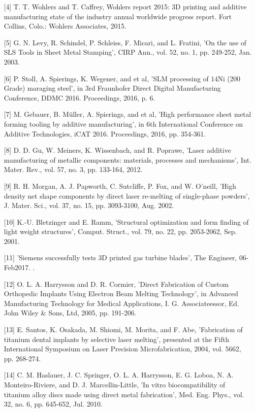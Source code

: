 \documentclass[10pt]{article}
\begin{document}
[4] T. T. Wohlers and T. Caffrey, Wohlers report 2015: 3D printing and additive manufacturing state of the industry annual worldwide progress report. Fort Collins, Colo.: Wohlers Associates, 2015.

[5] G. N. Levy, R. Schindel, P. Schleiss, F. Micari, and L. Fratini, 'On the use of SLS Tools in Sheet Metal Stamping', CIRP Ann., vol. 52, no. 1, pp. 249-252, Jan. 2003.

[6] P. Stoll, A. Spierings, K. Wegener, and et al, 'SLM processing of $14 \mathrm{Ni}$ (200 Grade) maraging steel', in 3rd Fraunhofer Direct Digital Manufacturing Conference, DDMC 2016. Proceedings, 2016, p. 6.

[7] M. Gebauer, B. Müller, A. Spierings, and et al, 'High performance sheet metal forming tooling by additive manufacturing', in 6th International Conference on Additive Technologies, iCAT 2016. Proceedings, 2016, pp. 354-361.

[8] D. D. Gu, W. Meiners, K. Wissenbach, and R. Poprawe, 'Laser additive manufacturing of metallic components: materials, processes and mechanisms', Int. Mater. Rev., vol. 57, no. 3, pp. 133-164, 2012.

[9] R. H. Morgan, A. J. Papworth, C. Sutcliffe, P. Fox, and W. O'neill, 'High density net shape components by direct laser re-melting of single-phase powders', J. Mater. Sci., vol. 37, no. 15, pp. 3093-3100, Aug. 2002.

[10] K.-U. Bletzinger and E. Ramm, 'Structural optimization and form finding of light weight structures', Comput. Struct., vol. 79, no. 22, pp. 2053-2062, Sep. 2001.

[11] 'Siemens successfully tests 3D printed gas turbine blades', The Engineer, 06-Feb2017. .

[12] O. L. A. Harrysson and D. R. Cormier, 'Direct Fabrication of Custom Orthopedic Implants Using Electron Beam Melting Technology', in Advanced Manufacturing Technology for Medical Applications, I. G. Associateessor, Ed. John Wiley \& Sons, Ltd, 2005, pp. 191-206.

[13] E. Santos, K. Osakada, M. Shiomi, M. Morita, and F. Abe, 'Fabrication of titanium dental implants by selective laser melting', presented at the Fifth International Symposium on Laser Precision Microfabrication, 2004, vol. 5662, pp. 268-274.

[14] C. M. Haslauer, J. C. Springer, O. L. A. Harrysson, E. G. Loboa, N. A. Monteiro-Riviere, and D. J. Marcellin-Little, 'In vitro biocompatibility of titanium alloy discs made using direct metal fabrication', Med. Eng. Phys., vol. 32, no. 6, pp. 645-652, Jul. 2010.
\end{document}
